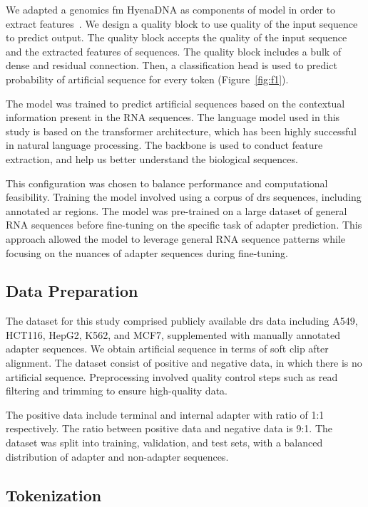 \documentclass[pdflatex, sn-mathphys-num, lineno]{sn-jnl}%
\theoremstyle{thmstyleone}%
\theoremstyle{thmstyletwo}%
\theoremstyle{thmstylethree}%
\begin{document}
We adapted a genomics \gls{fm} HyenaDNA as components of model in order to extract  features~\cite{nguyen2024hyenadna}.
We design a quality block to use quality of the input sequence to predict output.
The quality block accepts the quality of the input sequence and the extracted features of sequences.
The quality block includes a bulk of dense and residual connection.
Then, a classification head is used to predict probability of artificial sequence for every token (Figure~\ref{fig:f1}).

The model was trained to predict  artificial sequences based on the contextual information present in the RNA sequences.
The language model used in this study is based on the transformer architecture, which has been highly successful in natural language processing.
The backbone is used to conduct feature extraction, and help us better understand the biological sequences.

This configuration was chosen to balance performance and computational feasibility.
Training the model involved using a corpus of \gls{drs} sequences, including annotated ar regions.
The model was pre-trained on a large dataset of general RNA sequences before fine-tuning on the specific task of adapter prediction.
This approach allowed the model to leverage general RNA sequence patterns while focusing on the nuances of adapter sequences during fine-tuning.

\subsection{Data Preparation}\label{ssec:data}

The dataset for this study comprised publicly available \gls{drs} data including A549, HCT116, HepG2, K562, and MCF7, supplemented with manually annotated adapter sequences.
We obtain artificial sequence in terms of soft clip after alignment.
The dataset consist of positive and negative data, in which there is no artificial sequence.
Preprocessing involved quality control steps such as read filtering and trimming to ensure high-quality data.

The positive data include terminal and  internal adapter with ratio of 1:1 respectively.
The ratio between  positive data  and negative data is 9:1.
The dataset was split into training, validation, and test sets, with a balanced distribution of adapter and non-adapter sequences.

\subsection{Tokenization}\label{ssec:tokenization}
\end{document}
